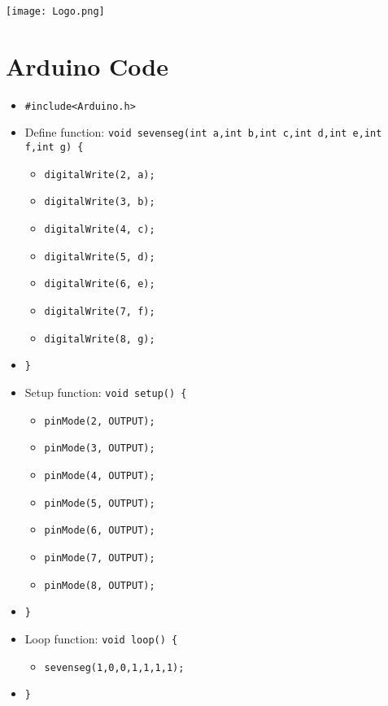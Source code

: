 \documentclass{article}
\begin{document}
\begin{center}
    \texttt{[image: Logo.png]}
\end{center}

\section*{Arduino Code}
\begin{itemize}
  \item \texttt{\#include<Arduino.h>}
  \item Define function: \texttt{void sevenseg(int a,int b,int c,int d,int e,int f,int g) \{}
    \begin{itemize}
      \item \texttt{digitalWrite(2, a);}
      \item \texttt{digitalWrite(3, b);}
      \item \texttt{digitalWrite(4, c);}
      \item \texttt{digitalWrite(5, d);}
      \item \texttt{digitalWrite(6, e);}
      \item \texttt{digitalWrite(7, f);}
      \item \texttt{digitalWrite(8, g);}
    \end{itemize}
  \item \texttt{\}}
  \item Setup function: \texttt{void setup() \{}
    \begin{itemize}
      \item \texttt{pinMode(2, OUTPUT);}
      \item \texttt{pinMode(3, OUTPUT);}
      \item \texttt{pinMode(4, OUTPUT);}
      \item \texttt{pinMode(5, OUTPUT);}
      \item \texttt{pinMode(6, OUTPUT);}
      \item \texttt{pinMode(7, OUTPUT);}
      \item \texttt{pinMode(8, OUTPUT);}
    \end{itemize}
  \item \texttt{\}}
  \item Loop function: \texttt{void loop() \{}
    \begin{itemize}
      \item \texttt{sevenseg(1,0,0,1,1,1,1);}
    \end{itemize}
  \item \texttt{\}}
\end{itemize}
\end{document}
